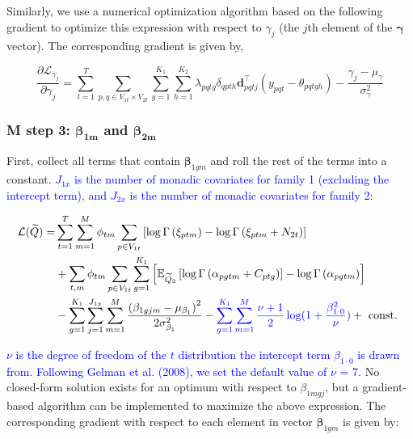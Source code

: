 \documentclass{article}
\begin{document}
Similarly, we use a numerical optimization algorithm based on the following gradient to optimize this expression with respect to $\gamma_j$ (the $j$th element of the $\boldsymbol{\gamma}$ vector). The corresponding gradient is given by,


$$
\frac{\partial \mathcal{L}_{\gamma_j}}{\partial \gamma_j}=\sum_{t=1}^{T} \sum_{p, q \in V_{1t} \times V_{2t}} \sum_{g=1}^{K_1} \sum_{h=1}^{K_2} \lambda_{p  q t g} \delta_{q p t h} \mathbf{d}_{pqtj}^\top \left(y_{p q t}-\theta_{p q t g h}\right)- \frac{\gamma_{j}-\mu_{\gamma}}{\sigma_{\gamma}^{2}}
$$


\subsubsection{M step 3: $\boldsymbol{\beta_{1m}}$ and $\boldsymbol{\beta_{2m}}$}
First, collect all terms that contain $\boldsymbol{\beta}_{1gm}$ and roll the rest of the terms into a constant. \textcolor{blue}{$J_{1 x}$ is the number of monadic covariates for family 1 (excluding the intercept term), and $J_{2 x}$ is the number of monadic covariates for family 2}:

\begin{equation*}
\begin{aligned} \mathcal{L}(\widetilde{Q})=& \sum_{t=1}^T \sum_{m=1}^M \phi_{tm}\sum_{p \in V_{1t}}\left[\log \Gamma\left(\xi_{p t m}\right)-\log \Gamma\left(\xi_{ptm}+N_{2t}\right)\right] \\ 
&+\sum_{t,m}\phi_{tm}\sum_{p \in V_{1t}} \sum_{g=1}^{K_{1}}\left[\mathbb{E}_{\widetilde{Q}_{2}}\left[\log \Gamma\left(\alpha_{p g t m}+C_{p t g}\right)\right]-\log \Gamma\left(\alpha_{p g t m}\right)\right] \\ 
&-\sum_{g=1}^{K_{1}} \sum_{j=1}^{J_{1 x}} \sum_{m=1}^M \frac{\left(\beta_{1 g j m}-\mu_{\beta_{1}}\right)^{2}}{2 \sigma_{\beta_{1}}^{2}} - \textcolor{blue}{\sum_{g=1}^{K_{1}} \sum_{m=1}^M \frac{\nu + 1}{2} \log(1 + \frac{\beta_{1\cdot 0}^2}{\nu})} + \text { const. } \end{aligned}
\end{equation*}

\textcolor{blue}{$\nu$ is the degree of freedom of the $t$ distribution the intercept term $\beta_{1\cdot0}$ is drawn from. Following Gelman et al. (2008), we set the default value of $\nu$ = 7}. No closed-form solution exists for an optimum with respect to $\beta_{1mgj}$,  but a gradient-based algorithm can be implemented to maximize the above expression. The corresponding gradient with respect to each element in vector $\boldsymbol{\beta}_{1gm}$ is given by:
\end{document}
